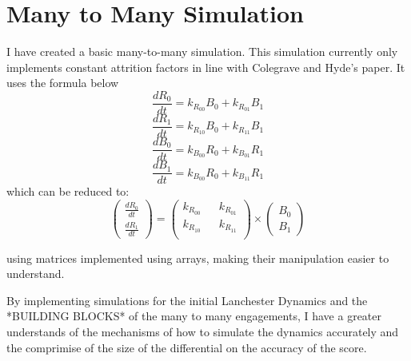 \section{Many to Many Simulation}

I have created a basic many-to-many simulation. This simulation currently only implements constant attrition factors in line with Colegrave and Hyde’s paper.
It uses the formula below
\[ \frac{dR_0}{dt} = k_{R_{00}} B_0 + k_{R_{01}} B_1\]
\[ \frac{dR_1}{dt} = k_{R_{10}} B_0 + k_{R_{11}} B_1\]
\[ \frac{dB_0}{dt} = k_{B_{00}} R_0 + k_{B_{01}} R_1\]
\[ \frac{dB_1}{dt} = k_{B_{00}} R_0 + k_{B_{11}} R_1\]
which can be reduced to:
\[\begin{pmatrix} \frac{dR_0}{dt}  \\ \frac{dR_1}{dt}  \end{pmatrix} = \begin{pmatrix}
    k_{R_{00}} && k_{R_{01}} \\
    k_{R_{10}} && k_{R_{11}} \\
\end{pmatrix} \times
\begin{pmatrix} B_0 \\ B_1
\end{pmatrix}\]

using matrices implemented using arrays, making their manipulation easier to understand.

By implementing simulations for the initial Lanchester Dynamics and the *BUILDING BLOCKS* of the many to many engagements, I have a greater understands of the mechanisms of how to simulate the dynamics accurately and the comprimise of the size of the differential on the accuracy of the score.